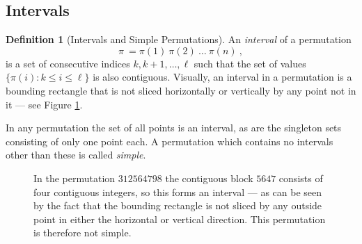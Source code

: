 \documentclass[11pt,a4paper]{article}
\newcommand{\plotptradius}{4pt}
\theoremstyle{definition}
\newtheorem{defn}[thm]{Definition}
\begin{document}
\subsection{Intervals} \label{sec:1.3}

\begin{defn}[Intervals and Simple Permutations] \label{def:uncentredinvtervals}
An \emph{interval} of a permutation
\[
\pi \ = \pi(1) \ \pi(2) \ \dots \ \pi(n) \ ,
\]
is a set of consecutive indices $k, k+1, \dots , \ell$ such that the set of values $\{\pi(i) : k \leq i \leq \ell\}$ is also contiguous. Visually, an interval in a
permutation is a bounding rectangle that is not sliced horizontally or vertically by any point not in it --- see Figure \ref{fig:interval}.

In any permutation the set of all points is an interval, as are the singleton sets consisting of only one point each. A permutation which contains no intervals other than these is called \emph{simple}.
\end{defn}

\begin{figure}[h]
\begin{center}
\end{center}
\caption{In the permutation $312564798$ the contiguous block $5647$ consists of four contiguous integers, so this forms an interval --- as can be seen by the fact that the bounding rectangle is not sliced by any outside point in either the horizontal or vertical direction. This permutation is therefore not simple.}
\label{fig:interval}
\end{figure}
\end{document}
